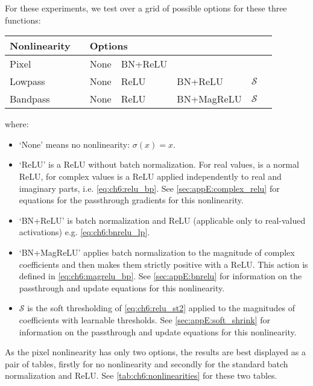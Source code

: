 For these experiments, we test over a grid of possible options for these three
functions:
\begin{table}[h!]
  \centering
\begin{tabular}{l l l l l l l}
  \toprule
  Nonlinearity & \hphantom{abc} & \multicolumn{4}{l}{Options} \\
  \midrule
  Pixel && None & BN+ReLU \\
  Lowpass && None & ReLU & BN+ReLU & $\mathcal{S}$ \\
  Bandpass && None & ReLU & BN+MagReLU & $\mathcal{S}$ 
  \\\bottomrule
\end{tabular}
\end{table}
where:
\begin{itemize}
  \item `None' means no nonlinearity: $\sigma(x) = x$.
  \item `ReLU' is a ReLU without batch normalization. For real values, is a
    normal ReLU, for complex values is a ReLU applied independently to real and
    imaginary parts, i.e.
    \eqref{eq:ch6:relu_bp}. See \autoref{sec:appE:complex_relu} for equations
    for the passthrough gradients for this nonlinearity.
  \item `BN+ReLU' is batch normalization and ReLU (applicable only to real-valued
    activations) e.g. \eqref{eq:ch6:bnrelu_lp}.
  \item `BN+MagReLU' applies batch normalization to the magnitude of complex
    coefficients and then makes them strictly positive with a ReLU\@. This action
    is defined in \eqref{eq:ch6:magrelu_bp}. See \autoref{sec:appE:bnrelu} for
    information on the passthrough and update equations for this nonlinearity.
  \item $\mathcal{S}$ is the soft thresholding of \eqref{eq:ch6:relu_st2}
    applied to the magnitudes of coefficients with learnable thresholds.  See
    \autoref{sec:appE:soft_shrink} for information on the passthrough and update
    equations for this nonlinearity.
\end{itemize}



As the pixel nonlinearity has only two options, the results are best displayed as
a pair of tables, firstly for no nonlinearity and secondly for the
standard batch normalization and ReLU\@. See
\autoref{tab:ch6:nonlinearities} for these two tables. 

